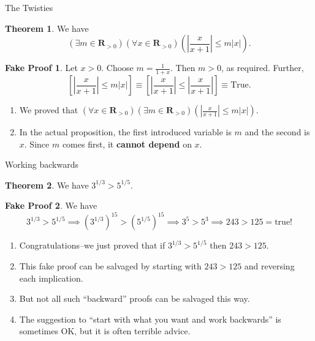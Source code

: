 \documentclass[fleqn]{beamer}
\newcommand{\reals}{\mathbf{R}}
\theoremstyle{definition}
\newtheorem{myth}{Theorem}
\newtheorem{myfakeproof}{Fake Proof}
\begin{document}
\begin{frame}{The Twisties}

\begin{myth}  We have
\[
   \left (\exists m \in \reals_{> 0} \right) \left (\forall x \in  \reals_{> 0} \right) \left(\left| \frac{x}{x+1} \right| \leq m |x| \right).
\]
\end{myth}
\begin{myfakeproof}    Let \(x > 0\).  Choose \(m = \frac{1}{1+x}\).  Then \(m > 0\), as required. Further,
\[
   \left [ \left | \frac{x}{x+1} \right | \leq m |x| \right] \equiv  \left [\left| \frac{x}{x+1} \right| \leq \left| \frac{x}{x+1} \right| \right] \equiv \mbox{True}.
\]
\end{myfakeproof}
\begin{enumerate}

\item We proved that  \( \left (\forall x \in  \reals_{> 0} \right) \left (\exists m \in \reals_{> 0} \right)  \left (\left| \frac{x}{x+1} \right| \leq m |x| \right) \).

\item In the actual proposition, the first introduced variable is \(m\) and the second is \(x\).  Since \(m\) comes first, it \textbf{cannot depend} on \(x\).

\end{enumerate}

\end{frame}
\begin{frame}{Working backwards}

\begin{myth} We have \(3^{1/3} > 5^{1/5} \). \end{myth}

\begin{myfakeproof}
We have
\small
\[
   3^{1/3} > 5^{1/5} \implies (3^{1/3})^{15} > (5^{1/5})^{15} \implies 3^5> 5^3 \implies 243 > 125  =  \mathrm{true!}
\]
\end{myfakeproof}

\begin{enumerate}
\item Congratulations--we just proved that if  \(3^{1/3} > 5^{1/5}\) then \( 243 > 125\).

\item This fake proof can be salvaged by starting with \( 243 > 125\) and reversing each implication.

\item But not all such ``backward'' proofs can be salvaged this way.

\item The  suggestion to ``start with what you want and work backwards'' is sometimes OK, but it
is often terrible advice.
\end{enumerate}
\end{frame}
\end{document}
